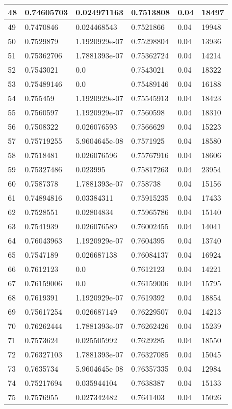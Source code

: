 \begin{longtable}{|l|l|l|l|l|l|}
48 & 0.74605703 & 0.024971163 & 0.7513808 & 0.04 & 18497 \\ \hline 
49 & 0.7470846 & 0.024468543 & 0.7521866 & 0.04 & 19948 \\ \hline 
50 & 0.7529879 & 1.1920929e-07 & 0.75298804 & 0.04 & 13936 \\ \hline 
51 & 0.75362706 & 1.7881393e-07 & 0.75362724 & 0.04 & 14214 \\ \hline 
52 & 0.7543021 & 0.0 & 0.7543021 & 0.04 & 18322 \\ \hline 
53 & 0.75489146 & 0.0 & 0.75489146 & 0.04 & 16188 \\ \hline 
54 & 0.755459 & 1.1920929e-07 & 0.75545913 & 0.04 & 18423 \\ \hline 
55 & 0.7560597 & 1.1920929e-07 & 0.7560598 & 0.04 & 18310 \\ \hline 
56 & 0.7508322 & 0.026076593 & 0.7566629 & 0.04 & 15223 \\ \hline 
57 & 0.75719255 & 5.9604645e-08 & 0.7571925 & 0.04 & 18580 \\ \hline 
58 & 0.7518481 & 0.026076596 & 0.75767916 & 0.04 & 18606 \\ \hline 
59 & 0.75327486 & 0.023995 & 0.75817263 & 0.04 & 23954 \\ \hline 
60 & 0.7587378 & 1.7881393e-07 & 0.758738 & 0.04 & 15156 \\ \hline 
61 & 0.74894816 & 0.03384311 & 0.75915235 & 0.04 & 17433 \\ \hline 
62 & 0.7528551 & 0.02804834 & 0.75965786 & 0.04 & 15140 \\ \hline 
63 & 0.7541939 & 0.026076589 & 0.76002455 & 0.04 & 14041 \\ \hline 
64 & 0.76043963 & 1.1920929e-07 & 0.7604395 & 0.04 & 13740 \\ \hline 
65 & 0.7547189 & 0.026687138 & 0.76084137 & 0.04 & 16924 \\ \hline 
66 & 0.7612123 & 0.0 & 0.7612123 & 0.04 & 14221 \\ \hline 
67 & 0.76159006 & 0.0 & 0.76159006 & 0.04 & 15795 \\ \hline 
68 & 0.7619391 & 1.1920929e-07 & 0.7619392 & 0.04 & 18854 \\ \hline 
69 & 0.75617254 & 0.026687149 & 0.76229507 & 0.04 & 14213 \\ \hline 
70 & 0.76262444 & 1.7881393e-07 & 0.76262426 & 0.04 & 15239 \\ \hline 
71 & 0.7573624 & 0.025505992 & 0.7629285 & 0.04 & 18550 \\ \hline 
72 & 0.76327103 & 1.7881393e-07 & 0.76327085 & 0.04 & 15045 \\ \hline 
73 & 0.7635734 & 5.9604645e-08 & 0.76357335 & 0.04 & 12984 \\ \hline 
74 & 0.75217694 & 0.035944104 & 0.7638387 & 0.04 & 15133 \\ \hline 
75 & 0.7576955 & 0.027342482 & 0.7641403 & 0.04 & 15026 \\ \hline 
\end{longtable}